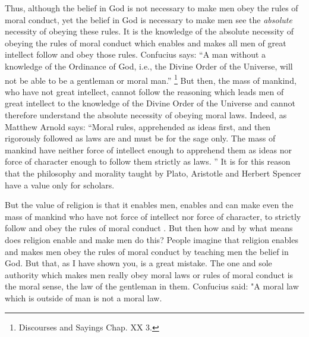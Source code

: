 Thus, although the belief in God is not necessary to make men obey the rules of moral conduct, yet the belief in God is necessary to make men see the \emph{absolute} necessity of obeying these rules.
It is the knowledge of the absolute necessity of obeying the rules of moral conduct which enables and makes all men of great intellect follow and obey those rules.
Confucius says: ``A man without a knowledge of the Ordinance of God, i.e., the Divine Order of the Universe, will not be able to be a gentleman or moral man.'' \footnote{Discourses and Sayings Chap. XX 3.}
But then, the mass of mankind, who have not great intellect, cannot follow the reasoning which leads men of great intellect to the knowledge of the Divine Order of the Universe and cannot therefore understand the absolute necessity of obeying moral laws. Indeed, as Matthew Arnold says:
``Moral rules, apprehended as ideas first, and then rigorously followed as laws are and must be for the sage only. The mass of mankind have neither force of intellect enough to apprehend them as ideas nor force of character enough to follow them strictly as laws. ''
It is for this reason that the philosophy and morality taught by Plato, Aristotle and Herbert Spencer have a value only for scholars.

But the value of religion is that it enables men, enables and can make even the mass of mankind who have not force of intellect nor force of character, to strictly follow and obey the rules of moral conduct . But then how and by what means does religion enable and make men do this? People imagine that religion enables and makes men obey the rules of moral conduct by teaching men the belief in God. But that, as I have shown you, is a great mistake. The one and sole authority which makes men really obey moral laws or rules of moral conduct is the moral sense, the law of the gentleman in them. Confucius said: "A moral law which is outside of man is not a moral law.

